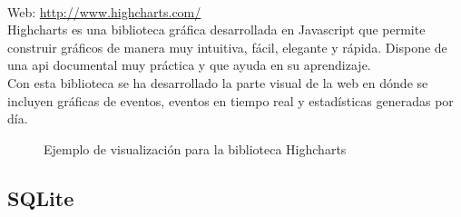\\

Web: \url{http://www.highcharts.com/}\\

Highcharts es una biblioteca gráfica desarrollada en Javascript que permite construir gráficos de manera muy intuitiva, fácil, elegante y rápida. Dispone de una api documental muy práctica y que ayuda en su aprendizaje.\\

Con esta biblioteca se ha desarrollado la parte visual de la web en dónde se incluyen gráficas de eventos, eventos en tiempo real y estadísticas generadas por día.

\begin{figure}[H]
  \caption{Ejemplo de visualización para la biblioteca Highcharts}
\end{figure}

\subsection{SQLite}


